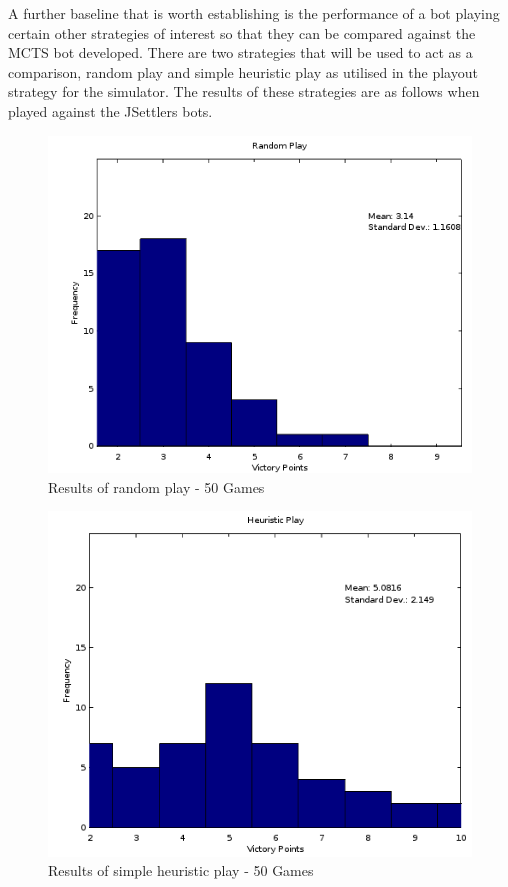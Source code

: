 \documentclass[]{article}
\begin{document}
\par A further baseline that is worth establishing is the performance of a bot playing certain other strategies of interest so that they can be compared against the MCTS bot developed. There are two strategies that will be used to act as a comparison, random play and simple heuristic play as utilised in the playout strategy for the simulator. The results of these strategies are as follows when played against the JSettlers bots.

\begin{center}
\begin{figure}[H]
 \centerline{\includegraphics[width=0.75\linewidth]{figures/random.png}}
  \caption{Results of random play - 50 Games}
  \label{fig:random1} 
\end{figure}

\begin{figure}[H]
 \centerline{\includegraphics[width=0.75\linewidth]{figures/heuristic.png}}
  \caption{Results of simple heuristic play - 50 Games}
  \label{fig:heuristic1} 
\end{figure}
\end{center}
\end{document}
